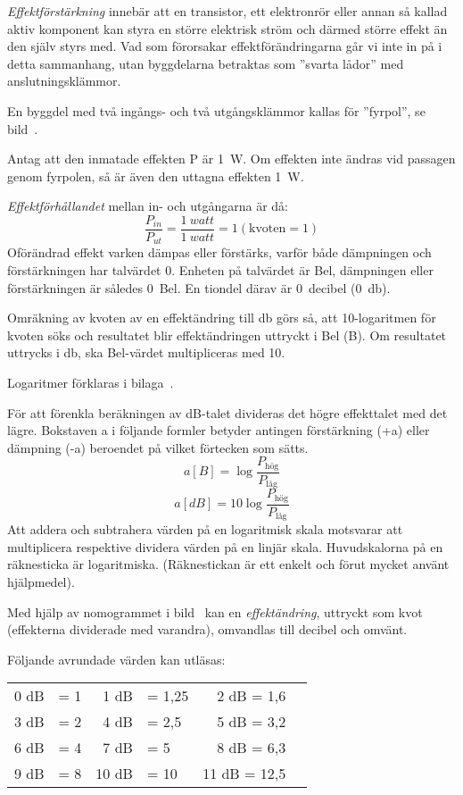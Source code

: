 \emph{Effektförstärkning} innebär att en transistor, ett elektronrör eller
annan så kallad aktiv komponent kan styra en större elektrisk ström och därmed
större effekt än den själv styrs med.
Vad som förorsakar effektförändringarna går vi inte in på i detta sammanhang,
utan byggdelarna betraktas som ''svarta lådor'' med anslutningsklämmor.

En byggdel med två ingångs- och två utgångsklämmor kallas för ''fyrpol'', se bild~.


Antag att den inmatade effekten P är \qty{1}{\watt}.
Om effekten inte ändras vid passagen genom fyrpolen, så är även den uttagna
effekten \qty{1}{\watt}.

\emph{Effektförhållandet} mellan in- och utgångarna är då:
\[\dfrac{P_{in}}{P_{ut}} = \dfrac{1\ \textit{watt}}{1\ \textit{watt}} = 1 (\text{kvoten} = 1)\]
Oförändrad effekt varken dämpas eller förstärks, varför både dämpningen och
förstärkningen har talvärdet 0.
Enheten på talvärdet är Bel, dämpningen eller förstärkningen är således 0~Bel.
En tiondel därav är 0~decibel (\qty{0}{\decibel}).

Omräkning av kvoten av en effektändring till \unit{\decibel} görs så, att
10-logaritmen för kvoten söks och resultatet blir effektändringen uttryckt i Bel
(B).
Om resultatet uttrycks i \unit{\decibel}, ska Bel-värdet multipliceras med 10.

Logaritmer förklaras i bilaga~.

För att förenkla beräkningen av dB-talet divideras det högre effekttalet med det
lägre.
Bokstaven a i följande formler betyder antingen förstärkning (+a) eller
dämpning (-a) beroendet på vilket förtecken som sätts.
\[a[B] = \log \dfrac{P_{\text{hög}}}{P_{\text{låg}}}\]
\[a[dB] = 10\log \dfrac{P_{\text{hög}}}{P_{\text{låg}}}\]
Att addera och subtrahera värden på en logaritmisk skala motsvarar att
multiplicera respektive dividera värden på en linjär skala.
Huvudskalorna på en räknesticka är logaritmiska.
(Räknestickan är ett enkelt och förut mycket använt hjälpmedel).

Med hjälp av nomogrammet i bild~ kan en
\emph{effektändring}, uttryckt som kvot (effekterna dividerade med varandra),
omvandlas till decibel och omvänt.


Följande avrundade värden kan utläsas:

\begin{center}
\begin{tabular}{rlrlrl}
0 dB & = 1 &  1 dB & =  1,25 & 2 dB = 1,6 \\
3 dB & = 2 &  4 dB & =  2,5  & 5 dB = 3,2 \\
6 dB & = 4 &  7 dB & =  5    & 8 dB = 6,3 \\
9 dB & = 8 & 10 dB & = 10    & 11 dB = 12,5
\end{tabular}
\end{center}

